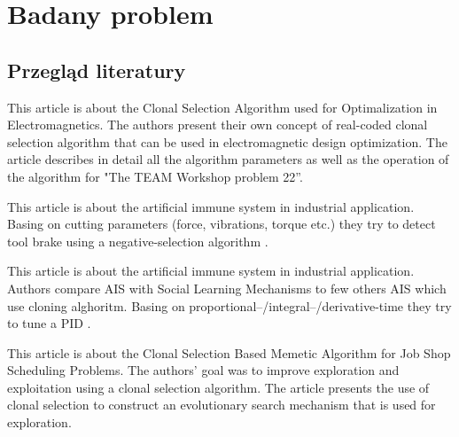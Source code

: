 \documentclass[a4paper]{article}
\begin{document}
\section{Badany problem}
\subsection{Przegląd literatury}
This article is about the Clonal Selection Algorithm used for Optimalization in Electromagnetics. The authors present their own concept of real-coded clonal selection algorithm that can be used in electromagnetic design optimization. The article describes in detail all the algorithm parameters as well as the operation of the algorithm for "The TEAM Workshop problem 22”\cite{1430953}.



This article is about the artificial immune system in industrial application. Basing on cutting parameters (force, vibrations, torque etc.) they try to detect tool brake using a negative-selection algorithm \cite{dasgupta1999artificial}.



This article is about the artificial immune system in industrial application. Authors compare AIS with Social Learning Mechanisms to few others AIS which use cloning alghoritm. Basing on proportional–/integral–/derivative-time they try to tune a PID \cite{wang_artificial_2017}.



This article is about the Clonal Selection Based Memetic Algorithm for Job Shop Scheduling Problems. The authors' goal was to improve exploration and exploitation using a clonal selection algorithm. The article presents the use of clonal selection to construct an evolutionary search mechanism that is used for exploration\cite{yang2008clonal}.

\newpage
\printbibliography
\end{document}
